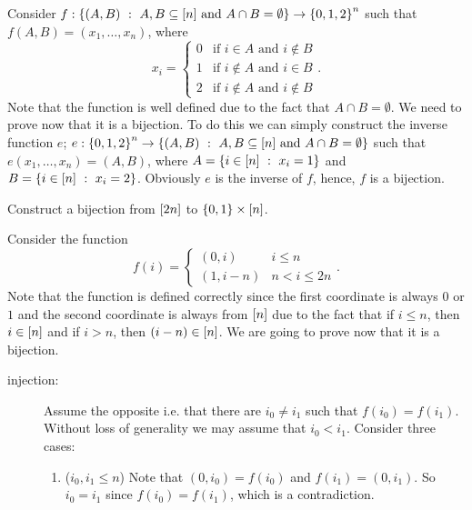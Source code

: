 \begin{chapterendexercises}
\begin{solution}
      Consider 
      $f : \set[{A, B \subseteq [n] \text{ and } A \cap B = \emptyset}]{(A, B)} \to
        \set{0, 1, 2}^n$ such that
      $f(A, B) = (x_1, \dots, x_n)$, where
      \[
        x_i =
        \begin{cases}
          0 & \text{if } i \in A \text{ and } i \not\in B \\
          1 & \text{if } i \not\in A \text{ and } i \in B \\
          2 & \text{if } i \not\in A \text{ and } i \not\in B
        \end{cases}.
      \]
      Note that the function is well defined due to the fact that $A \cap B =
      \emptyset$.
      We need to prove now that it is a bijection. To do this we can simply
      construct the inverse function $e$; $e : \set{0, 1, 2}^n \to 
      \set[{A, B \subseteq [n] \text{ and } A \cap B = \emptyset}]{(A, B)}$ such
      that $e(x_1, \dots, x_n) = (A, B)$, where
      $A = \set[x_i = 1]{i \in \range{n}}$ and 
      $B = \set[x_i = 2]{i \in \range{n}}$.
      Obviously $e$ is the inverse of $f$, hence, $f$ is a bijection.
    \end{solution}
  \exercise[recommended] Construct a bijection from  ${[{2n}]}$ to 
    $\set{0, 1} \times \range{n}$.
    \begin{solution}
      Consider the function
      \[
        f(i) =
        \begin{cases}
          (0, i) & i \le n \\
          (1, i - n) & n < i \le 2n
        \end{cases}.
      \]
      Note that the function is defined correctly since the first coordinate is
      always $0$ or $1$ and the second coordinate is always from ${[{n}]}$ due to the
      fact that if $i \le n$, then $i \in {[{n}]}$ and if $i > n$, then 
      $(i - n) \in {[{n}]}$.
      We are going to prove now that it is a bijection.
      \begin{description}
        \item[injection:]
          Assume the opposite i.e. that there are $i_0 \neq i_1$ such that
          $f(i_0) = f(i_1)$. Without loss of generality we may assume that $i_0
          < i_1$.
          Consider three cases:
          \begin{enumerate}
            \item ($i_0, i_1 \le n$) Note that $(0, i_0) = f(i_0)$ and
              $f(i_1) = (0, i_1)$. So $i_0 = i_1$ since $f(i_0) = f(i_1)$, which
              is a contradiction.

\end{enumerate}
\end{description}
\end{solution}
\end{chapterendexercises}

